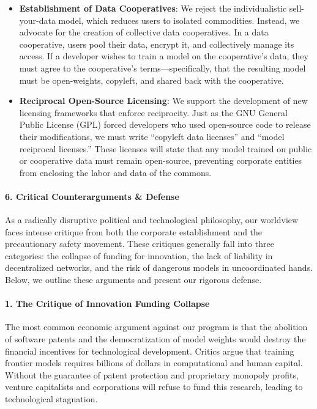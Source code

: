 \begin{itemize}
\tightlist
\item
  \textbf{Establishment of Data Cooperatives}: We reject the
  individualistic sell-your-data model, which reduces users to isolated
  commodities. Instead, we advocate for the creation of collective data
  cooperatives. In a data cooperative, users pool their data, encrypt
  it, and collectively manage its access. If a developer wishes to train
  a model on the cooperative's data, they must agree to the
  cooperative's terms---specifically, that the resulting model must be
  open-weights, copyleft, and shared back with the cooperative.
\item
  \textbf{Reciprocal Open-Source Licensing}: We support the development
  of new licensing frameworks that enforce reciprocity. Just as the GNU
  General Public License (GPL) forced developers who used open-source
  code to release their modifications, we must write ``copyleft data
  licenses'' and ``model reciprocal licenses.'' These licenses will
  state that any model trained on public or cooperative data must remain
  open-source, preventing corporate entities from enclosing the labor
  and data of the commons.
\end{itemize}

\paragraph{6. Critical Counterarguments \&
Defense}\label{critical-counterarguments-defense-13}

As a radically disruptive political and technological philosophy, our
worldview faces intense critique from both the corporate establishment
and the precautionary safety movement. These critiques generally fall
into three categories: the collapse of funding for innovation, the lack
of liability in decentralized networks, and the risk of dangerous models
in uncoordinated hands. Below, we outline these arguments and present
our rigorous defense.

\paragraph{1. The Critique of Innovation Funding
Collapse}\label{the-critique-of-innovation-funding-collapse}

The most common economic argument against our program is that the
abolition of software patents and the democratization of model weights
would destroy the financial incentives for technological development.
Critics argue that training frontier models requires billions of dollars
in computational and human capital. Without the guarantee of patent
protection and proprietary monopoly profits, venture capitalists and
corporations will refuse to fund this research, leading to technological
stagnation.


